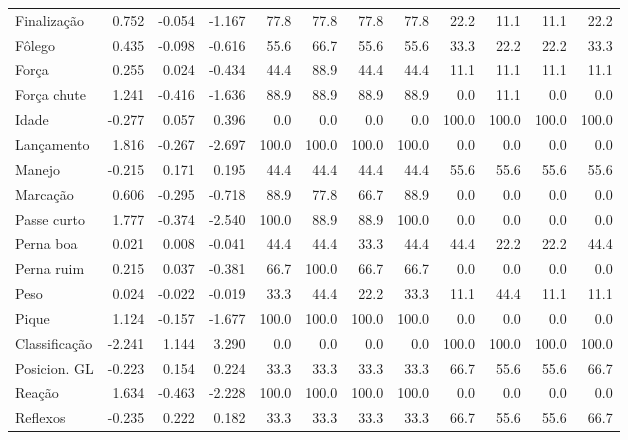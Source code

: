 \documentclass[review]{elsarticle}
\begin{document}
\begin{table}[!h]
\begin{scriptsize}
\begin{tabular}{l||rrr||rrr|r|||rrr||r}
\rowcolor{gray!10!} Finalização & 0.752 & -0.054 & -1.167 & 77.8 & 77.8 & 77.8 & 77.8 & 22.2 & 11.1 & 11.1 & 22.2 \\ 
\rowcolor{gray!30!} Fôlego & 0.435 & -0.098 & -0.616 & 55.6 & 66.7 & 55.6 & 55.6 & 33.3 & 22.2 & 22.2 & 33.3 \\ 
\rowcolor{gray!10!} Força & 0.255 & 0.024 & -0.434 & 44.4 & 88.9 & 44.4 & 44.4 & 11.1 & 11.1 & 11.1 & 11.1 \\ 
\rowcolor{gray!30!} Força chute & 1.241 & -0.416 & -1.636 & 88.9 & 88.9 & 88.9 & 88.9 & 0.0 & 11.1 & 0.0 & 0.0 \\ 
\rowcolor{gray!10!} Idade & -0.277 & 0.057 & 0.396 & 0.0 & 0.0 & 0.0 & 0.0 & 100.0 & 100.0 & 100.0 & 100.0 \\ 
\rowcolor{gray!30!} Lançamento & 1.816 & -0.267 & -2.697 & 100.0 & 100.0 & 100.0 & 100.0 & 0.0 & 0.0 & 0.0 & 0.0 \\ 
\rowcolor{gray!10!} Manejo & -0.215 & 0.171 & 0.195 & 44.4 & 44.4 & 44.4 & 44.4 & 55.6 & 55.6 & 55.6 & 55.6 \\ 
\rowcolor{gray!30!} Marcação & 0.606 & -0.295 & -0.718 & 88.9 & 77.8 & 66.7 & 88.9 & 0.0 & 0.0 & 0.0 & 0.0 \\ 
\rowcolor{gray!10!} Passe curto & 1.777 & -0.374 & -2.540 & 100.0 & 88.9 & 88.9 & 100.0 & 0.0 & 0.0 & 0.0 & 0.0 \\ 
\rowcolor{gray!30!} Perna boa & 0.021 & 0.008 & -0.041 & 44.4 & 44.4 & 33.3 & 44.4 & 44.4 & 22.2 & 22.2 & 44.4 \\ 
\rowcolor{gray!10!} Perna ruim & 0.215 & 0.037 & -0.381 & 66.7 & 100.0 & 66.7 & 66.7 & 0.0 & 0.0 & 0.0 & 0.0 \\ 
\rowcolor{gray!30!} Peso & 0.024 & -0.022 & -0.019 & 33.3 & 44.4 & 22.2 & 33.3 & 11.1 & 44.4 & 11.1 & 11.1 \\ 
\rowcolor{gray!10!} Pique & 1.124 & -0.157 & -1.677 & 100.0 & 100.0 & 100.0 & 100.0 & 0.0 & 0.0 & 0.0 & 0.0 \\ 
\rowcolor{gray!30!} Classificação & -2.241 & 1.144 & 3.290 & 0.0 & 0.0 & 0.0 & 0.0 & 100.0 & 100.0 & 100.0 & 100.0 \\ 
\rowcolor{gray!10!} Posicion. GL & -0.223 & 0.154 & 0.224 & 33.3 & 33.3 & 33.3 & 33.3 & 66.7 & 55.6 & 55.6 & 66.7 \\ 
\rowcolor{gray!30!} Reação & 1.634 & -0.463 & -2.228 & 100.0 & 100.0 & 100.0 & 100.0 & 0.0 & 0.0 & 0.0 & 0.0 \\ 
\rowcolor{gray!10!} Reflexos & -0.235 & 0.222 & 0.182 & 33.3 & 33.3 & 33.3 & 33.3 & 66.7 & 55.6 & 55.6 & 66.7 \\

\end{tabular}
\end{scriptsize}
\end{table}
\end{document}
